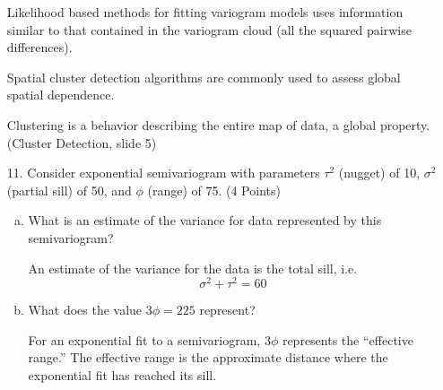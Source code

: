 \documentclass[letterpaper, 12pt]{article}
\begin{document}
\begin{enumerate}
Likelihood based methods for fitting variogram models uses information similar to that contained in the variogram cloud (all the squared pairwise differences).

Spatial cluster detection algorithms are commonly used to assess global spatial dependence.

{\sf
Clustering is a behavior describing the entire map of data, a global property.
(Cluster Detection, slide 5)
}

\item[11.]
Consider exponential semivariogram with parameters $\tau^2$ (nugget) of 10, $\sigma^2$ (partial sill) of 50, and $\phi$ (range) of 75. (4 Points)
\begin{enumerate}[a.]
\item
What is an estimate of the variance for data represented by this semivariogram?

{\sf
An estimate of the variance for the data is the total sill, i.e.
\[
\sigma^2 + \tau^2 = 60
\]
}

\item
What does the value $3\phi=225$ represent?

{\sf
For an exponential fit to a semivariogram, $3\phi$ represents the ``effective range.'' The effective range is the approximate distance where the exponential fit has reached its sill.
}

\end{enumerate}
\end{enumerate}
\end{document}

